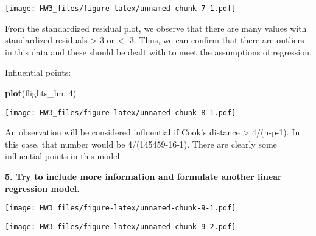 \documentclass[
]{article}
\newenvironment{Shaded}{\begin{snugshade}}{\end{snugshade}}
\newcommand{\DataTypeTok}[1]{\textcolor[rgb]{0.13,0.29,0.53}{#1}}
\newcommand{\DecValTok}[1]{\textcolor[rgb]{0.00,0.00,0.81}{#1}}
\newcommand{\KeywordTok}[1]{\textcolor[rgb]{0.13,0.29,0.53}{\textbf{#1}}}
\newcommand{\NormalTok}[1]{#1}
\newcommand{\OperatorTok}[1]{\textcolor[rgb]{0.81,0.36,0.00}{\textbf{#1}}}
\begin{document}
\texttt{[image: HW3\_files/figure-latex/unnamed-chunk-7-1.pdf]}

From the standardized residual plot, we observe that there are many
values with standardized residuals \textgreater{} 3 or \textless{} -3.
Thus, we can confirm that there are outliers in this data and these
should be dealt with to meet the assumptions of regression.

Influential points:

\begin{Shaded}
\begin{Highlighting}[]
\KeywordTok{plot}\NormalTok{(flights_lm, }\DecValTok{4}\NormalTok{)}
\end{Highlighting}
\end{Shaded}

\texttt{[image: HW3\_files/figure-latex/unnamed-chunk-8-1.pdf]}

An observation will be considered influential if Cook's distance
\textgreater{} 4/(n-p-1). In this case, that number would be
4/(145459-16-1). There are clearly some influential points in this
model.

\textbf{5. Try to include more information and formulate another linear
regression model.}

\begin{Shaded}
\end{Shaded}

\texttt{[image: HW3\_files/figure-latex/unnamed-chunk-9-1.pdf]}

\begin{Shaded}
\end{Shaded}

\texttt{[image: HW3\_files/figure-latex/unnamed-chunk-9-2.pdf]}

\begin{Shaded}
\end{Shaded}
\end{document}
